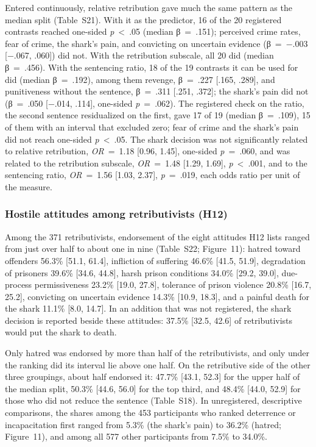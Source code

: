 Entered continuously, relative retribution gave much the same pattern as the median split (Table~S21). With it as the predictor, 16 of the 20 registered contrasts reached one-sided \emph{p}~\textless{}~.05 (median β~=~.151); perceived crime rates, fear of crime, the shark's pain, and convicting on uncertain evidence (β~=~−.003 {[}−.067, .060{]}) did not. With the retribution subscale, all 20 did (median β~=~.456). With the sentencing ratio, 18 of the 19 contrasts it can be used for did (median β~=~.192), among them revenge, β~=~.227 {[}.165, .289{]}, and punitiveness without the sentence, β~=~.311 {[}.251, .372{]}; the shark's pain did not (β~=~.050 {[}−.014, .114{]}, one-sided \emph{p}~=~.062). The registered check on the ratio, the second sentence residualized on the first, gave 17 of 19 (median β~=~.109), 15 of them with an interval that excluded zero; fear of crime and the shark's pain did not reach one-sided \emph{p}~\textless{}~.05. The shark decision was not significantly related to relative retribution, \emph{OR}~=~1.18 {[}0.96, 1.45{]}, one-sided \emph{p}~=~.060, and was related to the retribution subscale, \emph{OR}~=~1.48 {[}1.29, 1.69{]}, \emph{p}~\textless{}~.001, and to the sentencing ratio, \emph{OR}~=~1.56 {[}1.03, 2.37{]}, \emph{p}~=~.019, each odds ratio per unit of the measure.

\subsubsection{Hostile attitudes among retributivists (H12)}\label{hostile-attitudes-among-retributivists-h12}

Among the 371 retributivists, endorsement of the eight attitudes H12 lists ranged from just over half to about one in nine (Table~S22; Figure~11): hatred toward offenders 56.3\% {[}51.1, 61.4{]}, infliction of suffering 46.6\% {[}41.5, 51.9{]}, degradation of prisoners 39.6\% {[}34.6, 44.8{]}, harsh prison conditions 34.0\% {[}29.2, 39.0{]}, due-process permissiveness 23.2\% {[}19.0, 27.8{]}, tolerance of prison violence 20.8\% {[}16.7, 25.2{]}, convicting on uncertain evidence 14.3\% {[}10.9, 18.3{]}, and a painful death for the shark 11.1\% {[}8.0, 14.7{]}. In an addition that was not registered, the shark decision is reported beside these attitudes: 37.5\% {[}32.5, 42.6{]} of retributivists would put the shark to death.

Only hatred was endorsed by more than half of the retributivists, and only under the ranking did its interval lie above one half. On the retributive side of the other three groupings, about half endorsed it: 47.7\% {[}43.1, 52.3{]} for the upper half of the median split, 50.3\% {[}44.6, 56.0{]} for the top third, and 48.4\% {[}44.0, 52.9{]} for those who did not reduce the sentence (Table~S18). In unregistered, descriptive comparisons, the shares among the 453 participants who ranked deterrence or incapacitation first ranged from 5.3\% (the shark's pain) to 36.2\% (hatred; Figure~11), and among all 577 other participants from 7.5\% to 34.0\%.

